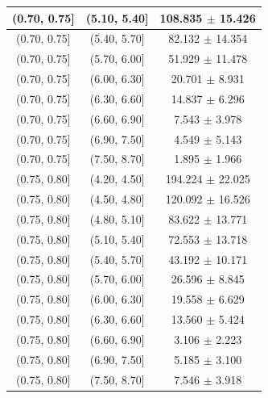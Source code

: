 \begin{longtable}{|c|c|c|}
\hline
(0.70, 0.75] & (5.10, 5.40] & 108.835 $\pm$ 15.426 \\ 
\hline
(0.70, 0.75] & (5.40, 5.70] & 82.132 $\pm$ 14.354 \\ 
\hline
(0.70, 0.75] & (5.70, 6.00] & 51.929 $\pm$ 11.478 \\ 
\hline
(0.70, 0.75] & (6.00, 6.30] & 20.701 $\pm$ 8.931 \\ 
\hline
(0.70, 0.75] & (6.30, 6.60] & 14.837 $\pm$ 6.296 \\ 
\hline
(0.70, 0.75] & (6.60, 6.90] & 7.543 $\pm$ 3.978 \\ 
\hline
(0.70, 0.75] & (6.90, 7.50] & 4.549 $\pm$ 5.143 \\ 
\hline
(0.70, 0.75] & (7.50, 8.70] & 1.895 $\pm$ 1.966 \\ 
\hline
(0.75, 0.80] & (4.20, 4.50] & 194.224 $\pm$ 22.025 \\ 
\hline
(0.75, 0.80] & (4.50, 4.80] & 120.092 $\pm$ 16.526 \\ 
\hline
(0.75, 0.80] & (4.80, 5.10] & 83.622 $\pm$ 13.771 \\ 
\hline
(0.75, 0.80] & (5.10, 5.40] & 72.553 $\pm$ 13.718 \\ 
\hline
(0.75, 0.80] & (5.40, 5.70] & 43.192 $\pm$ 10.171 \\ 
\hline
(0.75, 0.80] & (5.70, 6.00] & 26.596 $\pm$ 8.845 \\ 
\hline
(0.75, 0.80] & (6.00, 6.30] & 19.558 $\pm$ 6.629 \\ 
\hline
(0.75, 0.80] & (6.30, 6.60] & 13.560 $\pm$ 5.424 \\ 
\hline
(0.75, 0.80] & (6.60, 6.90] & 3.106 $\pm$ 2.223 \\ 
\hline
(0.75, 0.80] & (6.90, 7.50] & 5.185 $\pm$ 3.100 \\ 
\hline
(0.75, 0.80] & (7.50, 8.70] & 7.546 $\pm$ 3.918 \\ 
\hline
\end{longtable}
